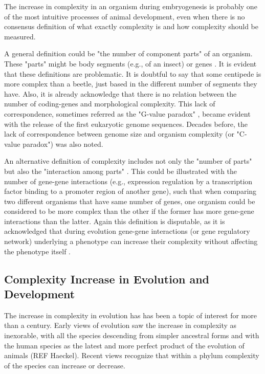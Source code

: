 
The increase in complexity in an organism during embryogenesis is probably one of the most intuitive processes of animal development, 
even when there is no consensus definition of what exactly complexity is and how complexity should be measured.


A general definition could be "the number of component parts" of an organism.
These "parts" might be body segments (e.g., of an insect) or genes
	\citep{Arthur2010}.
It is evident that these definitions are problematic.
It is doubtful to say that some centipede is more complex than a beetle, just based in the different number of segments they have.
Also, it is already acknowledge that there is no relation between the number of coding-genes and morphological complexity.
This lack of correspondence, sometimes referred as the "G-value paradox"
	\citep{Hahn2002},
became evident with the release of the first eukaryotic genome sequences.
Decades before, the lack of correspondence between genome size and organism complexity (or "C-value paradox") was also noted.


An alternative definition of complexity includes not only the "number of parts" but also the "interaction among parts" 
	\citep{Arthur2010}.
This could be illustrated with the number of gene-gene interactions (e.g., expression regulation by a transcription factor binding to a promoter region of another gene),
such that when comparing two different organisms that have same number of genes, 
one organism could be considered to be more complex than the other if the former has more gene-gene interactions than the latter.
Again this definition is disputable, as it is acknowledged that during evolution gene-gene interactions (or gene regulatory network) underlying a phenotype
can increase their complexity without affecting the phenotype itself
	\citep{Muller1999,True2001,Salazar-Ciudad2009}.

\subsection{Complexity Increase in Evolution and Development}

The increase in complexity in evolution has has been a topic of interest for more than a century.
Early views of evolution saw the increase in complexity as inexorable, with all the species descending
from simpler ancestral forms and with the human species as the latest and more perfect product of 
the evolution of animals
	(REF Haeckel).
Recent views recognize that within a phylum complexity of the species can increase or decrease.

